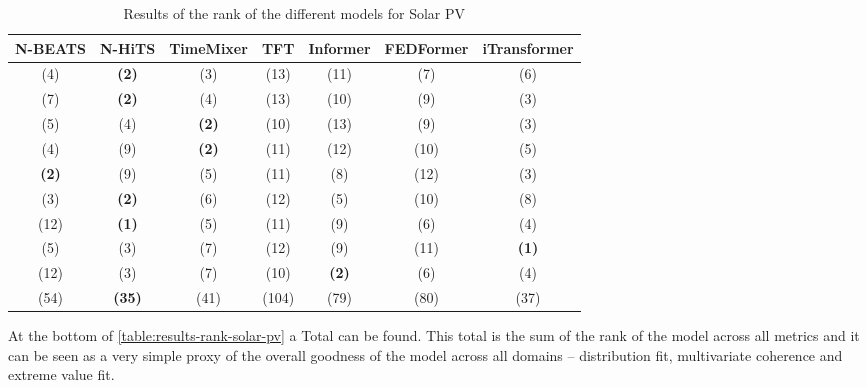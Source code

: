 \begin{table}[ht]
    \footnotesize
    \begin{flushright}
    \begin{tabular}[r]{|ccc|cccc}
        \toprule
        N-BEATS&N-HiTS&TimeMixer&TFT&Informer&FEDFormer&iTransformer \\
        \midrule            
        (4)&\textbf{(2)}&(3)&(13)&(11)&(7)&(6) \\
        (7)&\textbf{(2)}&(4)&(13)&(10)&(9)&(3) \\
        (5)&(4)&\textbf{(2)}&(10)&(13)&(9)&(3) \\
        \midrule
        (4)&(9)&\textbf{(2)}&(11)&(12)&(10)&(5) \\
        \textbf{(2)}&(9)&(5)&(11)&(8)&(12)&(3) \\
        (3)&\textbf{(2)}&(6)&(12)&(5)&(10)&(8) \\
        \midrule
        (12)&\textbf{(1)}&(5)&(11)&(9)&(6)&(4) \\
        (5)&(3)&(7)&(12)&(9)&(11)&\textbf{(1)} \\
        (12)&(3)&(7)&(10)&\textbf{(2)}&(6)&(4) \\
        \bottomrule
        (54)&\textbf{(35)}&(41)&(104)&(79)&(80)&(37) \\
        \bottomrule
    \end{tabular}
    \end{flushright}
    \caption{Results of the rank of the different models for Solar PV\label{long}}
    \label{table:results-rank-solar-pv}
\end{table}

At the bottom of \autoref{table:results-rank-solar-pv} a Total can be found. This total is the sum of the rank of the model across all metrics and it can be seen as a very simple proxy of the overall goodness of the model across all domains -- distribution fit, multivariate coherence and extreme value fit. 


